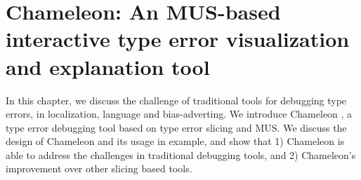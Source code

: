 \newcommand{\chameleon}{ChameleonIDE}
\graphicspath{{Figures/Chameleon}}

\chapter{Chameleon: An MUS-based interactive type error visualization and explanation tool}


\label{chap:chameleon:design} 

In this chapter, we discuss the challenge of traditional tools for debugging type errors, in localization, language and bias-adverting. We introduce Chameleon , a type error debugging tool based on type error slicing and MUS. We discuss the design of Chameleon and its usage in example, and show that 1) Chameleon is able to address the challenges in traditional debugging tools, and 2) Chameleon's improvement over other slicing based tools.








